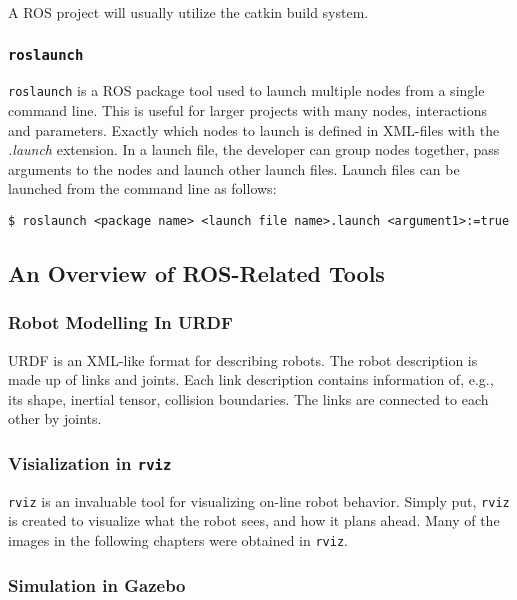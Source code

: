A \ac{ROS} project will usually utilize the catkin build system.

\subsubsection{\texttt{roslaunch}}

\texttt{roslaunch}\cite{ROS_launch} is a \ac{ROS} package tool used to launch multiple nodes from a single command line. This is useful for larger projects with many nodes, interactions and parameters. Exactly which nodes to launch is defined in XML-files with the \textit{.launch} extension. In a launch file, the developer can group nodes together, pass arguments to the nodes and launch other launch files. Launch files can be launched from the command line as follows:

\begin{verbatim}
$ roslaunch <package name> <launch file name>.launch <argument1>:=true
\end{verbatim}

\subsection{An Overview of ROS-Related Tools}

\subsubsection{Robot Modelling In URDF}

\ac{URDF} is an XML-like format for describing robots. The robot description is made up of links and joints. Each link description contains information of, e.g., its shape, inertial tensor, collision boundaries. The links are connected to each other by joints.

\subsubsection{Visialization in \texttt{rviz}}

\texttt{rviz} is an invaluable tool for visualizing on-line robot behavior. Simply put, \texttt{rviz} is created to visualize what the robot sees, and how it plans ahead. Many of the images in the following chapters were obtained in \texttt{rviz}. 

\subsubsection{Simulation in Gazebo}


